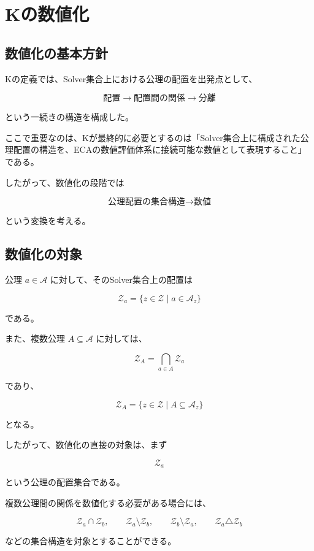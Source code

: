 \section{Kの数値化}

\subsection{数値化の基本方針}

Kの定義では、Solver集合上における公理の配置を出発点として、

\[
\text{配置}
\longrightarrow
\text{配置間の関係}
\longrightarrow
\text{分離}
\]

という一続きの構造を構成した。

ここで重要なのは、Kが最終的に必要とするのは「Solver集合上に構成された公理配置の構造を、ECAの数値評価体系に接続可能な数値として表現すること」である。

したがって、数値化の段階では

\[
\boxed{
\text{公理配置の集合構造}
\longrightarrow
\text{数値}
}
\]

という変換を考える。

\subsection{数値化の対象}

公理 $a\in\mathcal{A}$ に対して、そのSolver集合上の配置は

\[
\mathcal{Z}_a = \{z\in\mathcal{Z}\mid a\in\mathcal{A}_z\}
\]

である。

また、複数公理 $A\subseteq\mathcal{A}$ に対しては、

\[
\mathcal{Z}_A = \bigcap_{a\in A}\mathcal{Z}_a
\]

であり、

\[
\mathcal{Z}_A = \{z\in\mathcal{Z}\mid A\subseteq\mathcal{A}_z\}
\]

となる。

したがって、数値化の直接の対象は、まず

\[
\mathcal{Z}_a
\]

という公理の配置集合である。

複数公理間の関係を数値化する必要がある場合には、

\[
\mathcal{Z}_a\cap\mathcal{Z}_b,
\qquad
\mathcal{Z}_a\setminus\mathcal{Z}_b,
\qquad
\mathcal{Z}_b\setminus\mathcal{Z}_a,
\qquad
\mathcal{Z}_a\triangle\mathcal{Z}_b
\]

などの集合構造を対象とすることができる。

